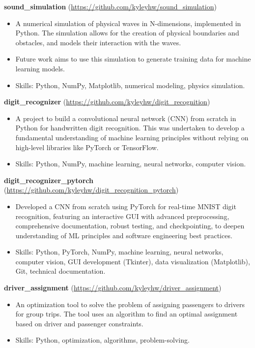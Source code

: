 \documentclass[a4paper,10pt]{extarticle}
\begin{document}
\textbf{sound\_simulation} (\url{https://github.com/kyleyhw/sound_simulation})
\begin{itemize}
    \item A numerical simulation of physical waves in N-dimensions, implemented in Python. The simulation allows for the creation of physical boundaries and obstacles, and models their interaction with the waves.
    \item Future work aims to use this simulation to generate training data for machine learning models.
    \item Skills: Python, NumPy, Matplotlib, numerical modeling, physics simulation.
\end{itemize}

\vspace{0.5em}

\textbf{digit\_recognizer} (\url{https://github.com/kyleyhw/digit_recognition})
\begin{itemize}
    \item A project to build a convolutional neural network (CNN) from scratch in Python for handwritten digit recognition. This was undertaken to develop a fundamental understanding of machine learning principles without relying on high-level libraries like PyTorch or TensorFlow.
    \item Skills: Python, NumPy, machine learning, neural networks, computer vision.
\end{itemize}

\vspace{0.5em}

\textbf{digit\_recognizer\_pytorch} (\url{https://github.com/kyleyhw/digit_recognition_pytorch})
\begin{itemize}
   \item Developed a CNN from scratch using PyTorch for real-time MNIST digit recognition, featuring an interactive GUI with advanced preprocessing,
     comprehensive documentation, robust testing, and checkpointing, to deepen understanding of ML principles and software engineering best
     practices.
   \item Skills: Python, PyTorch, NumPy, machine learning, neural networks, computer vision, GUI development (Tkinter), data visualization (Matplotlib),
      Git, technical documentation.
\end{itemize}

\vspace{0.5em}

\textbf{driver\_assignment} (\url{https://github.com/kyleyhw/driver_assignment})
\begin{itemize}
    \item An optimization tool to solve the problem of assigning passengers to drivers for group trips. The tool uses an algorithm to find an optimal assignment based on driver and passenger constraints.
    \item Skills: Python, optimization, algorithms, problem-solving.
\end{itemize}
\end{document}
